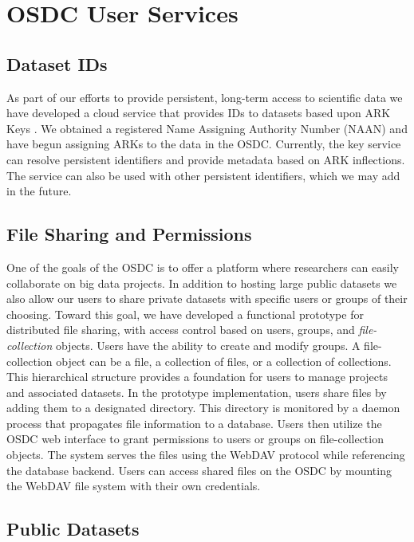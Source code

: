 \documentclass[11pt,twocolumn]{article}
\begin{document}
\section{OSDC User Services}

\subsection{Dataset IDs}
As part of our efforts to provide persistent, long-term access to
scientific data we have developed a cloud service that provides IDs to
datasets based upon ARK Keys \cite{Kunze:2006}. We obtained a
registered Name Assigning Authority Number (NAAN) and have begun
assigning ARKs to the data in the OSDC. Currently, the key service can resolve persistent
identifiers and provide metadata based on ARK inflections. The service
can also be used with other persistent identifiers, which we may add in
the future.

\subsection{File Sharing and Permissions}
\label{sec:permissions}

One of the goals of the OSDC is to offer a platform where researchers
can easily collaborate on big data projects. In addition to hosting
large public datasets we also allow our users to share private
datasets with specific users or groups of their choosing. Toward this
goal, we have developed a functional prototype for distributed file
sharing, with access control based on users, groups, and
\emph{file-collection} objects. Users have the ability to create and
modify groups. A file-collection object can be a file, a collection of
files, or a collection of collections. This hierarchical structure
provides a foundation for users to manage projects and associated
datasets. In the prototype implementation, users share files by adding
them to a designated directory. This directory is monitored by a
daemon process that propagates file information to a database. Users
then utilize the OSDC web interface to grant permissions to users or
groups on file-collection objects. The system serves the files using
the WebDAV protocol while referencing the database backend. Users can
access shared files on the OSDC by mounting the WebDAV file system
with their own credentials.

\subsection{Public Datasets}
\label{sec:datasets}
\end{document}

